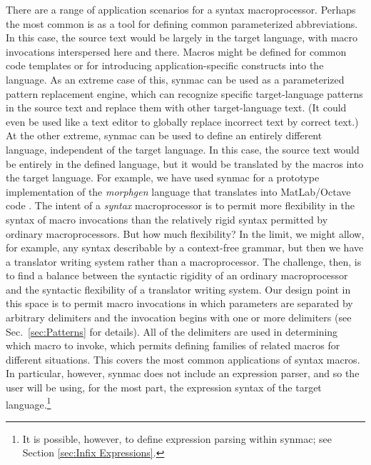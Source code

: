 \documentclass[12pt]{article}
\begin{document}
There are a range of application scenarios for a syntax macroprocessor.
Perhaps the most common is as a tool for defining common parameterized abbreviations.
In this case, the source text would be largely in the target language, with macro invocations interspersed here and there.
Macros might be defined for common code templates or for introducing application-specific constructs into the language.
As an extreme case of this, synmac can be used as a parameterized pattern replacement engine, which can recognize specific target-language patterns in the source text and replace them with other target-language text.
(It could even be used like a text editor to globally replace incorrect text by correct text.)
At the other extreme, synmac can be used to define an entirely different language, independent of the target language.
In this case, the source text would be entirely in the defined language, but it would be translated by the macros into the target language.
For example, we have used synmac for a prototype implementation of the \emph{morphgen} language that translates into MatLab/Octave code \cite{CF2D-TR}.
The intent of a \emph{syntax} macroprocessor is to permit more flexibility in the syntax of macro invocations than the relatively rigid syntax permitted by ordinary macroprocessors.
But how much flexibility?
In the limit, we might allow, for example, any syntax describable by a context-free grammar, but then we have a translator writing system rather than a macroprocessor.
The challenge, then, is to find a balance between the syntactic rigidity of an ordinary macroprocessor and the syntactic flexibility of a translator writing system.
Our design point in this space is to permit macro invocations in which parameters are separated by arbitrary delimiters and the invocation begins with one or more delimiters (see Sec.\ \ref{sec:Patterns} for details).
All of the delimiters are used in determining which macro to invoke, which permits defining families of related macros for different situations.
This covers the most common applications of syntax macros.
In particular, however, synmac does not include an expression parser, and so the user will be using, for the most part, the expression syntax of the target language.\footnote{
It is possible, however, to define expression parsing within synmac;
see Section \ref{sec:Infix Expressions}.
}
\end{document}
